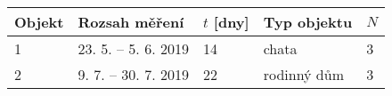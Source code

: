 	\begin{tabular}{lllll}
		\toprule
		Objekt & Rozsah měření & $t$ [dny] & Typ objektu &$N$\\
		\midrule
		1 & 23. 5. -- 5. 6. 2019 & 14 & chata & 3\\
		2 & 9. 7. -- 30. 7. 2019 & 22 & rodinný dům & 3\\
		\bottomrule
	\end{tabular}
